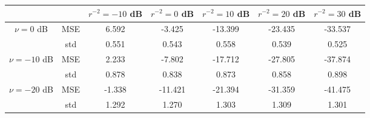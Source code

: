 \begin{tabular}{ccccccc}
\toprule
             &     &  $r^{-2}=-10$ dB &  $r^{-2}=0$ dB &  $r^{-2}=10$ dB &  $r^{-2}=20$ dB &  $r^{-2}=30$ dB \\
\midrule
$\nu=0$ dB & MSE &            6.592 &         -3.425 &         -13.399 &         -23.435 &         -33.537 \\
             & std &            0.551 &          0.543 &           0.558 &           0.539 &           0.525 \\ \hline
$\nu=-10$ dB & MSE &            2.233 &         -7.802 &         -17.712 &         -27.805 &         -37.874 \\
             & std &            0.878 &          0.838 &           0.873 &           0.858 &           0.898 \\ \hline
$\nu=-20$ dB & MSE &           -1.338 &        -11.421 &         -21.394 &         -31.359 &         -41.475 \\
             & std &            1.292 &          1.270 &           1.303 &           1.309 &           1.301 \\
\bottomrule
\end{tabular}
